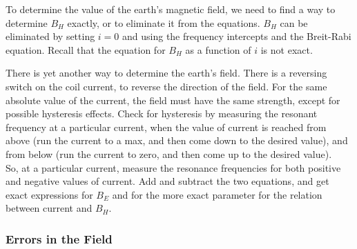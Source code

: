 \documentclass{../lab}
\begin{document}
To determine the value of the earth's magnetic field, we need to find a way to determine $B_{H}$ exactly, or to eliminate it from the equations. $B_{H}$ can be eliminated by setting $i = 0$ and using the frequency intercepts and the Breit-Rabi equation. Recall that the equation for $B_{H}$ as a function of $i$ is not exact. \\

\newpage

There is yet another way to determine the earth's field. There is a reversing switch on the coil current, to reverse the direction of the field. For the same absolute value of the current, the field must have the same strength, except for possible hysteresis effects. Check for hysteresis by measuring the resonant frequency at a particular current, when the value of current is reached from above (run the current to a max, and then come down to the desired value), and from below (run the current to zero, and then come up to the desired value). \\

So, at a particular current, measure the resonance frequencies for both positive and negative values of current. Add and subtract the two equations, and get exact expressions for $B_{E}$ and for the more exact parameter for the relation between current and $B_{H}$.

\subsubsection{Errors in the Field}
\end{document}
